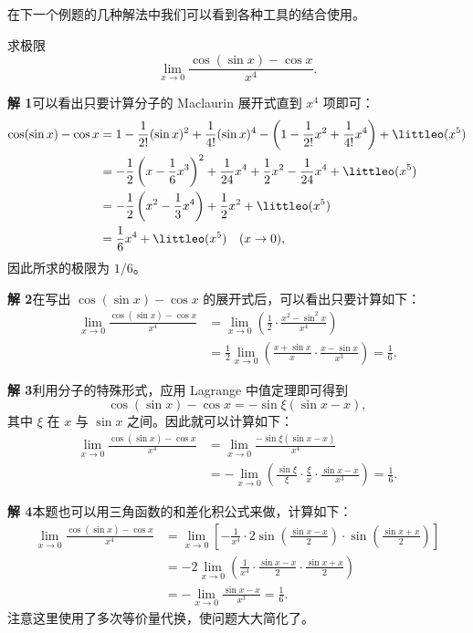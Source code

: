 在下一个例题的几种解法中我们可以看到各种工具的结合使用。

\begin{xexample}[8.1.8]
求极限
\[
  \lim_{x\to0}\frac{\cos(\sin x)-\cos x}{x^4}.
\]
\end{xexample}
\begin{xsolution}
\textbf{解 1}\quad 可以看出只要计算分子的 Maclaurin 展开式直到 $x^4$ 项即可：
\begin{align*}
  \cos(\sin x)-\cos x
  &=1-\frac1{2!}(\sin x)^2+\frac1{4!}(\sin x)^4
    -\left(1-\frac1{2!}x^2+\frac1{4!}x^4\right)+\littleo(x^5)\\
  &=-\frac12\left(x-\frac16x^3\right)^2+\frac1{24}x^4+\frac12x^2-\frac1{24}x^4+\littleo(x^5)\\
  &=-\frac12\left(x^2-\frac13x^4\right)+\frac12x^2+\littleo(x^5)\\
  &=\frac16x^4+\littleo(x^5)\quad(x\to0),
\end{align*}
因此所求的极限为 $1/6$。

\textbf{解 2}\quad 在写出 $\cos(\sin x)-\cos x$ 的展开式后，可以看出只要计算如下：
\begin{align*}
  \lim_{x\to0}\frac{\cos(\sin x)-\cos x}{x^4}
  &=\lim_{x\to0}\left(\frac12\cdot\frac{x^2-\sin^2x}{x^4}\right)\\
  &=\frac12\lim_{x\to0}\left(\frac{x+\sin x}{x}\cdot\frac{x-\sin x}{x^3}\right)
  =\frac16.
\end{align*}

\textbf{解 3}\quad 利用分子的特殊形式，应用 Lagrange 中值定理即可得到
\[
  \cos(\sin x)-\cos x=-\sin\xi(\sin x-x),
\]
其中 $\xi$ 在 $x$ 与 $\sin x$ 之间。因此就可以计算如下：
\begin{align*}
  \lim_{x\to0}\frac{\cos(\sin x)-\cos x}{x^4}
  &=\lim_{x\to0}\frac{-\sin\xi(\sin x-x)}{x^4}\\
  &=-\lim_{x\to0}\left(\frac{\sin\xi}{\xi}\cdot\frac{\xi}{x}\cdot\frac{\sin x-x}{x^3}\right)
  =\frac16.
\end{align*}

\textbf{解 4}\quad 本题也可以用三角函数的和差化积公式来做，计算如下：
\begin{align*}
  \lim_{x\to0}\frac{\cos(\sin x)-\cos x}{x^4}
  &=\lim_{x\to0}\left[-\frac1{x^4}\cdot2\sin\left(\frac{\sin x-x}{2}\right)
  \cdot\sin\left(\frac{\sin x+x}{2}\right)\right]\\
  &=-2\lim_{x\to0}\left(\frac1{x^4}\cdot\frac{\sin x-x}{2}\cdot\frac{\sin x+x}{2}\right)\\
  &=-\lim_{x\to0}\frac{\sin x-x}{x^3}=\frac16.
\end{align*}
注意这里使用了多次等价量代换，使问题大大简化了。
\end{xsolution}

